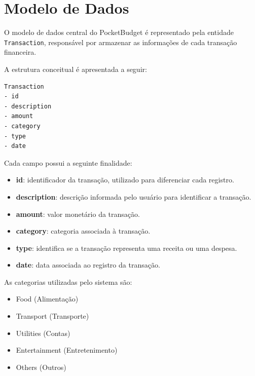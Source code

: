 \documentclass[12pt,a4paper]{article}
\begin{document}
\section{Modelo de Dados}

O modelo de dados central do PocketBudget é representado pela entidade \texttt{Transaction}, responsável por armazenar as informações de cada transação financeira.

A estrutura conceitual é apresentada a seguir:

\begin{verbatim}
Transaction
- id
- description
- amount
- category
- type
- date
\end{verbatim}

Cada campo possui a seguinte finalidade:

\begin{itemize}
    \item \textbf{id}: identificador da transação, utilizado para diferenciar cada registro.
    
    \item \textbf{description}: descrição informada pelo usuário para identificar a transação.
    
    \item \textbf{amount}: valor monetário da transação.
    
    \item \textbf{category}: categoria associada à transação.
    
    \item \textbf{type}: identifica se a transação representa uma receita ou uma despesa.
    
    \item \textbf{date}: data associada ao registro da transação.
\end{itemize}

As categorias utilizadas pelo sistema são:

\begin{itemize}
    \item Food (Alimentação)
    \item Transport (Transporte)
    \item Utilities (Contas)
    \item Entertainment (Entretenimento)
    \item Others (Outros)
\end{itemize}
\end{document}
